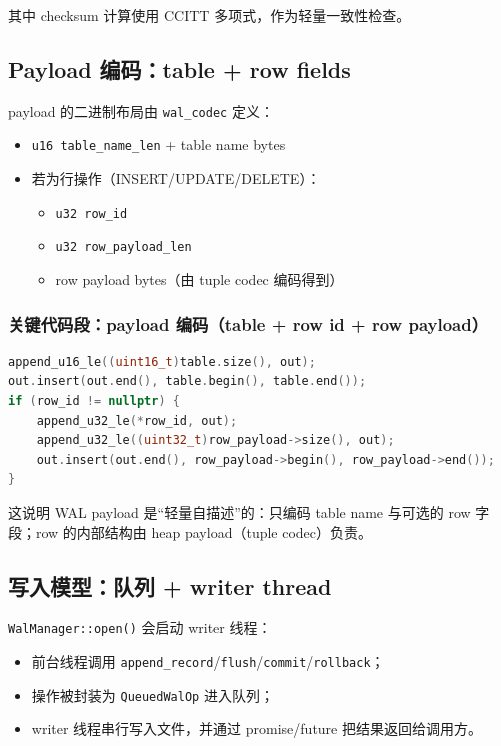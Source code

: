 其中 checksum 计算使用 CCITT 多项式，作为轻量一致性检查。

\subsection{Payload 编码：table + row fields}

payload 的二进制布局由 \texttt{wal\_codec} 定义：

\begin{itemize}
  \item \texttt{u16 table\_name\_len} + table name bytes
  \item 若为行操作（INSERT/UPDATE/DELETE）：
    \begin{itemize}
      \item \texttt{u32 row\_id}
      \item \texttt{u32 row\_payload\_len}
      \item row payload bytes（由 tuple codec 编码得到）
    \end{itemize}
\end{itemize}

\subsubsection{关键代码段：payload 编码（table + row id + row payload）}

\begin{lstlisting}[language=C++,caption={walcodec::build\_payload 的布局（节选）}]
append_u16_le((uint16_t)table.size(), out);
out.insert(out.end(), table.begin(), table.end());
if (row_id != nullptr) {
    append_u32_le(*row_id, out);
    append_u32_le((uint32_t)row_payload->size(), out);
    out.insert(out.end(), row_payload->begin(), row_payload->end());
}
\end{lstlisting}

这说明 WAL payload 是“轻量自描述”的：只编码 table name 与可选的 row 字段；row 的内部结构由 heap payload（tuple codec）负责。

\subsection{写入模型：队列 + writer thread}

\texttt{WalManager::open()} 会启动 writer 线程：

\begin{itemize}
  \item 前台线程调用 \texttt{append\_record}/\texttt{flush}/\texttt{commit}/\texttt{rollback}；
  \item 操作被封装为 \texttt{QueuedWalOp} 进入队列；
  \item writer 线程串行写入文件，并通过 promise/future 把结果返回给调用方。
\end{itemize}

